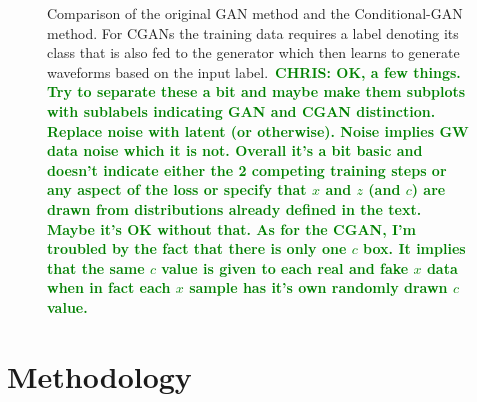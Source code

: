 \documentclass[12pt]{iopart}
\newcommand{\chris}[1]{\textbf{\textcolor{green}{CHRIS: #1}}}
\begin{document}
\begin{figure}
    \centering
    \caption{Comparison of the original GAN method and the
Conditional-GAN method. For CGANs the training data requires a label denoting
its class that is also fed to the generator which then learns to generate
waveforms based on the input label.~\chris{OK, a few things. Try to separate
these a bit and maybe make them subplots with sublabels indicating GAN and CGAN
distinction. Replace noise with latent (or otherwise). Noise implies GW data
noise which it is not. Overall it's a bit basic and doesn't indicate either the
2 competing training steps or any aspect of the loss or specify that $x$ and
$z$ (and $c$) are drawn from distributions already defined in the text. Maybe it's OK without
that. As for the CGAN, I'm troubled by the fact that there is only one $c$ box.
It implies that the same $c$ value is given to each real and fake $x$ data when
in fact each $x$ sample has it's own randomly drawn $c$ value.}} \label{fig:gan_comparison}
\end{figure}

\section{Methodology}

\end{document}
